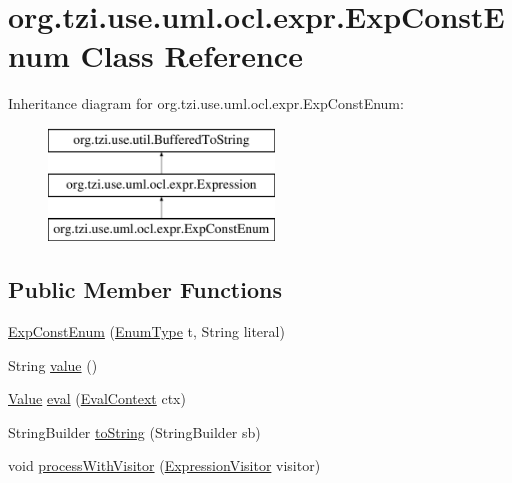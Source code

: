 \hypertarget{classorg_1_1tzi_1_1use_1_1uml_1_1ocl_1_1expr_1_1_exp_const_enum}{\section{org.\-tzi.\-use.\-uml.\-ocl.\-expr.\-Exp\-Const\-Enum Class Reference}
\label{classorg_1_1tzi_1_1use_1_1uml_1_1ocl_1_1expr_1_1_exp_const_enum}
}
Inheritance diagram for org.\-tzi.\-use.\-uml.\-ocl.\-expr.\-Exp\-Const\-Enum\-:\begin{figure}[H]
\begin{center}
\leavevmode
\includegraphics[height=3.000000cm]{classorg_1_1tzi_1_1use_1_1uml_1_1ocl_1_1expr_1_1_exp_const_enum}
\end{center}
\end{figure}
\subsection*{Public Member Functions}
\begin{DoxyCompactItemize}
\item 
\hyperlink{classorg_1_1tzi_1_1use_1_1uml_1_1ocl_1_1expr_1_1_exp_const_enum_a0fe23d4c3d30900d6a7ac627aadd94fc}{Exp\-Const\-Enum} (\hyperlink{classorg_1_1tzi_1_1use_1_1uml_1_1ocl_1_1type_1_1_enum_type}{Enum\-Type} t, String literal)
\item 
String \hyperlink{classorg_1_1tzi_1_1use_1_1uml_1_1ocl_1_1expr_1_1_exp_const_enum_afe0ee7bf8a305a9fc80634d9f7f4b7bc}{value} ()
\item 
\hyperlink{classorg_1_1tzi_1_1use_1_1uml_1_1ocl_1_1value_1_1_value}{Value} \hyperlink{classorg_1_1tzi_1_1use_1_1uml_1_1ocl_1_1expr_1_1_exp_const_enum_afaeb3b09c865d9cdf62465beb81a684f}{eval} (\hyperlink{classorg_1_1tzi_1_1use_1_1uml_1_1ocl_1_1expr_1_1_eval_context}{Eval\-Context} ctx)
\item 
String\-Builder \hyperlink{classorg_1_1tzi_1_1use_1_1uml_1_1ocl_1_1expr_1_1_exp_const_enum_a79dbeb7e414bb4974e7ab990b5bff1aa}{to\-String} (String\-Builder sb)
\item 
void \hyperlink{classorg_1_1tzi_1_1use_1_1uml_1_1ocl_1_1expr_1_1_exp_const_enum_a9d752b963647c0784d89e031095212cd}{process\-With\-Visitor} (\hyperlink{interfaceorg_1_1tzi_1_1use_1_1uml_1_1ocl_1_1expr_1_1_expression_visitor}{Expression\-Visitor} visitor)
\end{DoxyCompactItemize}
